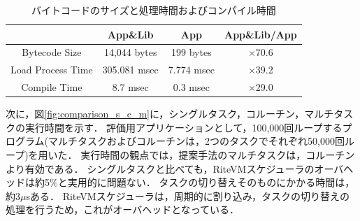 \documentclass[submit,techrep]{ipsj}
\begin{document}

\begin{table}[t]
    \centering
    \caption{バイトコードのサイズと処理時間およびコンパイル時間}
    {\tabcolsep=0.1cm
    \begin{tabular}{c||c|c|c}
                            & App\&Lib     & App        &   App\&Lib/App  \\ \hline
          Bytecode Size     & 14,044 bytes & 199 bytes  &   $\times$70.6          \\ %
          Load Process Time & 305.081 msec & 7.774 msec &   $\times$39.2          \\
          Compile Time      & 8.7 msec     & 0.3 msec   &   $\times$29.0          \\
    \end{tabular}
    }
    \vspace{-5mm}
    \label{tab:size_and_time}
\end{table}

次に，図\ref{fig:comparison_s_c_m}に，シングルタスク，コルーチン，マルチタスクの実行時間を示す．
評価用アプリケーションとして，100,000回ループするプログラム(マルチタスクおよびコルーチンは，2つのタスクでそれぞれ50,000回ループ)を用いた．
実行時間の観点では，提案手法のマルチタスクは，コルーチンより有効である．
シングルタスクと比べても，RiteVMスケジューラのオーバヘッドは約5\%と実用的に問題ない．
タスクの切り替えそのものにかかる時間は，約3$\mu$sある．
RiteVMスケジューラは，周期的に割り込み，タスクの切り替えの処理を行うため，これがオーバヘッドとなっている．
\end{document}
